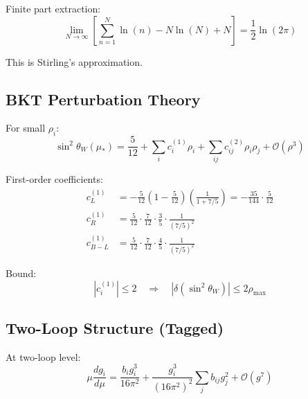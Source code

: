 \documentclass[11pt,a4paper]{article}
\theoremstyle{definition}
\begin{document}
Finite part extraction:
\begin{equation}
\label{eq:finite_extraction}
\lim_{N\to\infty}\left[\sum_{n=1}^{N}\ln(n) - N\ln(N) + N\right] = \frac{1}{2}\ln(2\pi)
\end{equation}

This is Stirling's approximation.

\subsection{BKT Perturbation Theory}
\label{subsec:bkt_pert}

For small $\rho_i$:
\begin{equation}
\label{eq:sw2_bkt_expansion}
\sin^2\theta_W(\mu_*) = \frac{5}{12} + \sum_i c_i^{(1)}\rho_i + \sum_{ij}c_{ij}^{(2)}\rho_i\rho_j + \mathcal{O}(\rho^3)
\end{equation}

First-order coefficients:
\begin{align}
\label{eq:c1_L}
c_L^{(1)} &= -\frac{5}{12}\left(1 - \frac{5}{12}\right)\left(\frac{1}{1 + 7/5}\right) = -\frac{35}{144} \cdot \frac{5}{12} \\
\label{eq:c1_R}
c_R^{(1)} &= \frac{5}{12} \cdot \frac{7}{12} \cdot \frac{3}{5} \cdot \frac{1}{(7/5)^2} \\
\label{eq:c1_BL}
c_{B-L}^{(1)} &= \frac{5}{12} \cdot \frac{7}{12} \cdot \frac{4}{5} \cdot \frac{1}{(7/5)^2}
\end{align}

Bound:
\begin{equation}
\label{eq:bound_explicit}
|c_i^{(1)}| \leq 2 \quad \Rightarrow \quad |\delta(\sin^2\theta_W)| \leq 2\rho_{\max}
\end{equation}

\subsection{Two-Loop Structure (Tagged)}
\label{subsec:two_loop}

At two-loop level:
\begin{equation}
\label{eq:two_loop_beta}
\mu\frac{dg_i}{d\mu} = \frac{b_i g_i^3}{16\pi^2} + \frac{g_i^3}{(16\pi^2)^2}\sum_j b_{ij}g_j^2 + \mathcal{O}(g^7)
\end{equation}
\end{document}
